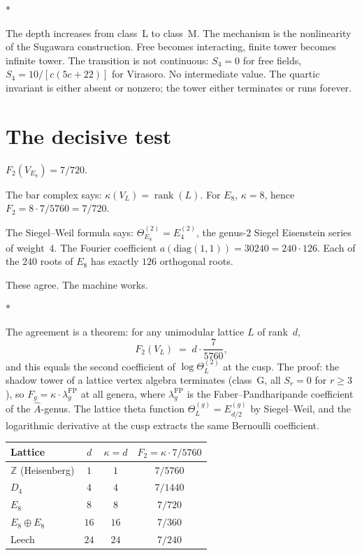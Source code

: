 \documentclass[11pt]{article}
\newcommand{\Z}{\mathbb{Z}}
\newcommand{\sep}{\bigskip\begin{center}$*$\end{center}\medskip}
\begin{document}
\sep

The depth increases from class~L to class~M.  The mechanism is
the nonlinearity of the Sugawara construction.  Free becomes
interacting, finite tower becomes infinite tower.  The transition
is not continuous: $S_4 = 0$ for free fields,
$S_4 = 10/[c(5c{+}22)]$ for Virasoro.  No intermediate value.
The quartic invariant is either absent or nonzero; the tower
either terminates or runs forever.


\section{The decisive test}
\label{sec:decisive-test}

$F_2(V_{E_8}) = 7/720$.

The bar complex says: $\kappa(V_L)=\operatorname{rank}(L)$.
For $E_8$, $\kappa=8$, hence
$F_2 = 8 \cdot 7/5760 = 7/720$.

The Siegel--Weil formula says:
$\Theta_{E_8}^{(2)} = E_4^{(2)}$, the genus-$2$ Siegel
Eisenstein series of weight~$4$.  The Fourier coefficient
$a(\mathrm{diag}(1,1)) = 30240 = 240 \cdot 126$.
Each of the $240$ roots of $E_8$ has exactly $126$ orthogonal
roots.

These agree.  The machine works.

\sep

The agreement is a theorem: for any unimodular lattice $L$
of rank~$d$,
\begin{equation}\label{eq:lattice-f2}
F_2(V_L) \;=\; d \cdot \frac{7}{5760},
\end{equation}
and this equals the second coefficient of
$\log\Theta_L^{(2)}$ at the cusp.  The proof: the shadow
tower of a lattice vertex algebra terminates (class~G, all
$S_r = 0$ for $r \geq 3$), so
$F_g = \kappa \cdot \lambda_g^{\mathrm{FP}}$ at all genera,
where $\lambda_g^{\mathrm{FP}}$ is the Faber--Pandharipande
coefficient of the $\hat{A}$-genus.  The lattice theta function
$\Theta_L^{(g)} = E_{d/2}^{(g)}$ by Siegel--Weil, and the
logarithmic derivative at the cusp extracts the same
Bernoulli coefficient.

\begin{center}
\small
\renewcommand{\arraystretch}{1.15}
\begin{tabular}{@{}lccc@{}}
\textbf{Lattice}
  & $d$
  & $\kappa = d$
  & $F_2 = \kappa \cdot 7/5760$ \\
\hline
$\Z$ (Heisenberg) & $1$ & $1$ & $7/5760$ \\
$D_4$ & $4$ & $4$ & $7/1440$ \\
$E_8$ & $8$ & $8$ & $7/720$ \\
$E_8 \oplus E_8$ & $16$ & $16$ & $7/360$ \\
Leech & $24$ & $24$ & $7/240$
\end{tabular}
\end{center}
\end{document}
